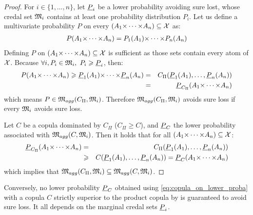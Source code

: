 \begin{proof}
    For $i\in\{1,\dots,n\}$, let ${\underline{P}}_i$ be a lower probability avoiding sure lost, \ie whose credal set ${\mathfrak{M}}_i$ contains at least one probability distribution $P_i$. Let us define a multivariate probability $P$ on every $(A_1{\times\dots\times} A_n)\subseteq{\mathcal{X}}$ as:
    \begin{eqnarray*}
        P(A_1{\times\dots\times} A_n) = P_1(A_1){\times\dots\times} P_n(A_n)
    \end{eqnarray*}
    Defining $P$ on $(A_1{\times\dots\times} A_n)\subseteq{\mathcal{X}}$ is sufficient as those sets contain every atom of ${\mathcal{X}}$.
    Because $\forall i, P_i\in{\mathfrak{M}}_i,~P_i\geqslant {\underline{P}}_i$, then:
    \begin{eqnarray*}
        P(A_1{\times\dots\times} A_n) \geqslant {\underline{P}}_1(A_1){\times\dots\times} {\underline{P}}_n(A_n) &=& C_\Pi({\underline{P}}_1(A_1), \dots, {\underline{P}}_n(A_n))\\
        &=& {\underline{P}}_{C_\Pi}(A_1{\times\dots\times} A_n)
    \end{eqnarray*}
which means $P\in{\mathfrak{M}}_{agg}(C_\Pi, {\mathfrak{M}}_i)$. Therefore ${\mathfrak{M}}_{agg}(C_\Pi, {\mathfrak{M}}_i)$ avoids sure loss if every ${\mathfrak{M}}_i$ avoids sure loss.

Let $C$ be a copula dominated by $C_\Pi$ (\ie $C_\Pi\geqslant C$), and ${\underline{P}}_C$ the lower probability associated with ${\mathfrak{M}}_{agg}(C, {\mathfrak{M}}_i)$. Then it holds that for all $(A_1{\times\dots\times} A_n)\subseteq{\mathcal{X}}$:
\begin{eqnarray*}
{\underline{P}}_{C_\Pi}(A_1{\times\dots\times} A_n)&=&C_\Pi({\underline{P}}_1(A_1), \dots, {\underline{P}}_n(A_n)) \\
    &\geqslant& C({\underline{P}}_1(A_1),\dots, {\underline{P}}_n(A_n)) = {\underline{P}}_C(A_1{\times\dots\times} A_n)
\end{eqnarray*}
which implies that ${\mathfrak{M}}_{agg}(C_\Pi, {\mathfrak{M}}_i)\subseteq {\mathfrak{M}}_{agg}(C, {\mathfrak{M}}_i)$.
\end{proof}

\begin{proposition}
    Conversely, no lower probability ${\underline{P}}_C$ obtained using \eqref{eq:copula_on_lower_proba} with a copula $C$ strictly superior to the product copula by is guaranteed to avoid sure loss. It all depends on the marginal credal sets ${\underline{P}}_i$.
\end{proposition}

